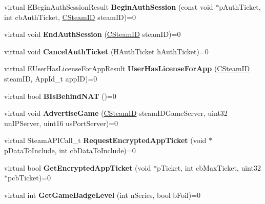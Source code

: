 \begin{DoxyCompactItemize}
virtual E\+Begin\+Auth\+Session\+Result {\bfseries Begin\+Auth\+Session} (const void $\ast$p\+Auth\+Ticket, int cb\+Auth\+Ticket, \hyperlink{class_c_steam_i_d}{C\+Steam\+ID} steam\+ID)=0
\item 
\mbox{\label{class_i_steam_user_adc1f5a4bb8630ee630a09625e1abdba1}} 
virtual void {\bfseries End\+Auth\+Session} (\hyperlink{class_c_steam_i_d}{C\+Steam\+ID} steam\+ID)=0
\item 
\mbox{\label{class_i_steam_user_a6c278ab86639cc929816d8f3b7a17a77}} 
virtual void {\bfseries Cancel\+Auth\+Ticket} (H\+Auth\+Ticket h\+Auth\+Ticket)=0
\item 
\mbox{\label{class_i_steam_user_a925dc981e305be647259d138cfd362f6}} 
virtual E\+User\+Has\+License\+For\+App\+Result {\bfseries User\+Has\+License\+For\+App} (\hyperlink{class_c_steam_i_d}{C\+Steam\+ID} steam\+ID, App\+Id\+\_\+t app\+ID)=0
\item 
\mbox{\label{class_i_steam_user_acb4dd088859b733337936c9766f7790f}} 
virtual bool {\bfseries B\+Is\+Behind\+N\+AT} ()=0
\item 
\mbox{\label{class_i_steam_user_a07f6db96869e033a13b13e54f7ce2235}} 
virtual void {\bfseries Advertise\+Game} (\hyperlink{class_c_steam_i_d}{C\+Steam\+ID} steam\+I\+D\+Game\+Server, uint32 un\+I\+P\+Server, uint16 us\+Port\+Server)=0
\item 
\mbox{\label{class_i_steam_user_a1ac14d72bff3350b59605826992fc176}} 
virtual Steam\+A\+P\+I\+Call\+\_\+t {\bfseries Request\+Encrypted\+App\+Ticket} (void $\ast$p\+Data\+To\+Include, int cb\+Data\+To\+Include)=0
\item 
\mbox{\label{class_i_steam_user_a4c5ea66df88fd0527d1a51179638d44a}} 
virtual bool {\bfseries Get\+Encrypted\+App\+Ticket} (void $\ast$p\+Ticket, int cb\+Max\+Ticket, uint32 $\ast$pcb\+Ticket)=0
\item 
\mbox{\label{class_i_steam_user_afceb88c7b3241d23d3279650543d5d13}} 
virtual int {\bfseries Get\+Game\+Badge\+Level} (int n\+Series, bool b\+Foil)=0
\item 

\end{DoxyCompactItemize}
